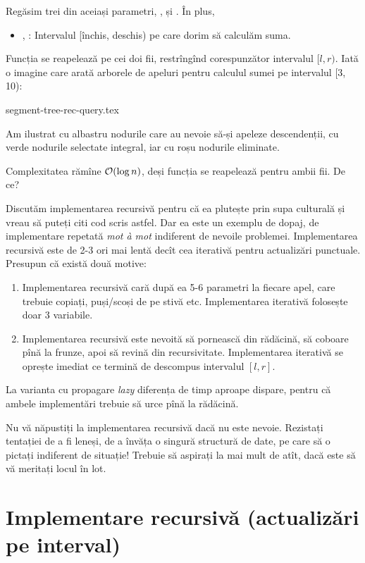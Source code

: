 \documentclass[../main.tex]{subfiles}
\begin{document}
Regăsim trei din aceiași parametri, ,  și . În plus,

\begin{itemize}
  \item {}, : Intervalul [închis, deschis) pe care dorim să calculăm suma.
\end{itemize}

Funcția se reapelează pe cei doi fii, restrîngînd corespunzător intervalul $[l, r)$. Iată o imagine care arată arborele de apeluri pentru calculul sumei pe intervalul [3, 10):

{segment-tree-rec-query.tex}

Am ilustrat cu albastru nodurile care au nevoie să-și apeleze descendenții, cu verde nodurile selectate integral, iar cu roșu nodurile eliminate.

Complexitatea rămîne $\mathcal{O}(\log n)$, deși funcția se reapelează pentru ambii fii. De ce?

Discutăm implementarea recursivă pentru că ea plutește prin supa culturală și vreau să puteți citi cod scris astfel. Dar ea este un exemplu de dopaj, de implementare repetată \textit{mot à mot} indiferent de nevoile problemei. Implementarea recursivă este de 2-3 ori mai lentă decît cea iterativă pentru actualizări punctuale. Presupun că există două motive:

\begin{enumerate}
  \item Implementarea recursivă cară după ea 5-6 parametri la fiecare apel, care trebuie copiați, puși/scoși de pe stivă etc. Implementarea iterativă folosește doar 3 variabile.

  \item Implementarea recursivă este nevoită să pornească din rădăcină, să coboare pînă la frunze, apoi să revină din recursivitate. Implementarea iterativă se oprește imediat ce termină de descompus intervalul $[l,r]$.
\end{enumerate}

La varianta cu propagare \textit{lazy} diferența de timp aproape dispare, pentru că ambele implementări trebuie să urce pînă la rădăcină.

Nu vă năpustiți la implementarea recursivă dacă nu este nevoie. Rezistați tentației de a fi leneși, de a învăța o singură structură de date, pe care să o pictați indiferent de situație! Trebuie să aspirați la mai mult de atît, dacă este să vă meritați locul în lot.

\section{Implementare recursivă (actualizări pe interval)}
\end{document}
